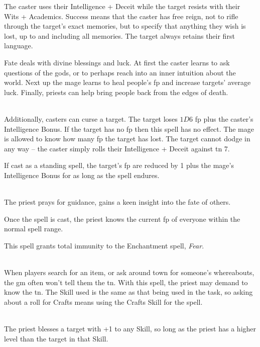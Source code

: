 \begin{multicols}{2}
The caster uses their Intelligence + Deceit while the target resists with their Wits + Academics.
Success means that the caster has free reign, not to rifle through the target's exact memories, but to specify that anything they wish is lost, up to and including all memories.
The target always retains their first language.

\end{multicols}

Fate deals with divine blessings and luck. At first the caster learns to ask questions of the gods, or to perhaps reach into an inner intuition about the world. Next up the mage learns to heal people's \gls{fp} and increase targets' average luck. Finally, priests can help bring people back from the edges of death.

\begin{multicols}{2}

\spelllevel

\\
Additionally, casters can curse a target. The target loses $1D6$ \gls{fp} plus the caster's Intelligence Bonus. If the target has no \gls{fp} then this spell has no effect. The mage is allowed to know how many \gls{fp} the target has lost. The target cannot dodge in any way -- the caster simply rolls their Intelligence + Deceit against \gls{tn} 7.

If cast as a standing spell, the target's \gls{fp} are reduced by 1 plus the mage's Intelligence Bonus for as long as the spell endures.

\\
The priest prays for guidance, gains a keen insight into the fate of others.

Once the spell is cast, the priest knows the current \gls{fp} of everyone within the normal spell range.

This spell grants total immunity to the Enchantment spell, \textit{Fear}.

\\
When players search for an item, or ask around town for someone's whereabouts, the \gls{gm} often won't tell them the \gls{tn}.  With this spell, the priest may demand to know the \gls{tn}.  The Skill used is the same as that being used in the task, so asking about a roll for Crafts means using the Crafts Skill for the spell.

\\
The priest blesses a target with +1 to any Skill, so long as the priest has a higher level than the target in that Skill.


\end{multicols}
